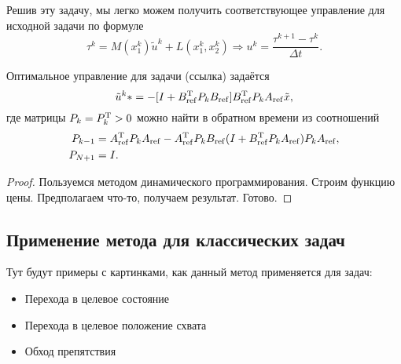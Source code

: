 \begin{remark}
    Решив эту задачу, мы легко можем получить соответствующее управление для исходной задачи по формуле
    \begin{equation}
        \tau^k = M(x_1^k)\tilde u^k + L(x_1^k, x_2^k) \Longrightarrow u^k = \frac{\tau^{k+1} - \tau^{k}}{\Delta t}.
    \end{equation}    
\end{remark}

\begin{theorem}
    Оптимальное управление для задачи (ссылка) задаётся
    \begin{equation}
        \tilde u^k* = -[I + B_{\mathrm{ref}}^\mathrm{T} P_k B_{\mathrm{ref}}]B_{\mathrm{ref}}^\mathrm{T} P_k A_{\mathrm{ref}} \tilde x,
    \end{equation}
    где матрицы $P_k = P_k^\mathrm{T} > 0$ можно найти в обратном времени из соотношений
    \begin{equation}
        \begin{aligned}
            P_{k-1} &= A_{\mathrm{ref}}^\mathrm{T} P_k A_{\mathrm{ref}} - A_{\mathrm{ref}}^\mathrm{T} P_k B_{\mathrm{ref}}(I + B_{\mathrm{ref}}^\mathrm{T} P_k A_{\mathrm{ref}}) P_k A_{\mathrm{ref}},
            \\
            P_{N+1} &= I.
        \end{aligned}
    \end{equation}
\end{theorem}

\begin{proof}

    Пользуемся методом динамического программирования. Строим функцию цены. Предполагаем что-то, получаем результат. Готово.

\end{proof}

\subsection{Применение метода для классических задач}

Тут будут примеры с картинками, как данный метод применяется для задач:
\begin{itemize}
    \item Перехода в целевое состояние
    \item Перехода в целевое положение схвата
    \item Обход препятствия
\end{itemize}